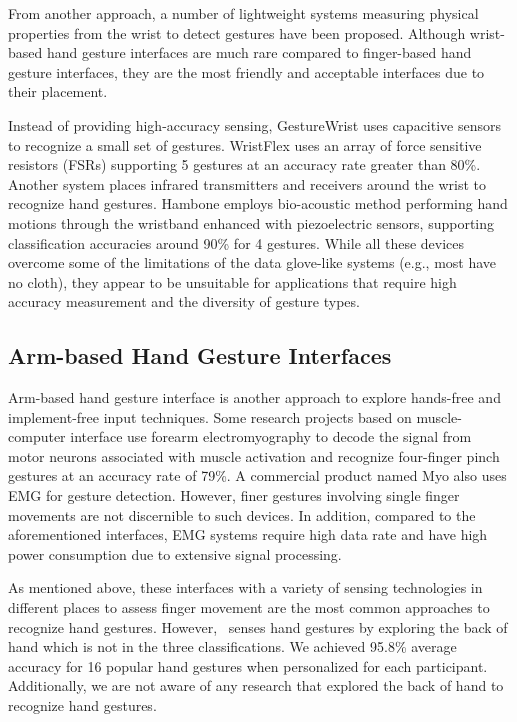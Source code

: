 \documentclass{sigchi}
\begin{document}
From another approach, a number of lightweight systems measuring physical properties from the wrist to detect gestures have been proposed. 
Although wrist-based hand gesture interfaces are much rare compared to finger-based hand gesture interfaces, they are the most friendly and acceptable interfaces due to their placement.

Instead of providing high-accuracy sensing, GestureWrist \cite{Rekimoto:2001:GGU:580581.856565} uses capacitive sensors to recognize a small set of gestures. WristFlex \cite{Dementyev:2014:WLG:2642918.2647396} uses an array of force sensitive resistors (FSRs) supporting 5 gestures at an accuracy rate greater than 80\%. Another system \cite{Fukui:2011:HSC:2030112.2030154} places infrared transmitters and receivers around the wrist to recognize hand gestures. Hambone \cite{4373768} employs bio-acoustic method performing hand motions through the wristband enhanced with piezoelectric sensors, supporting classification accuracies around 90\% for 4 gestures. While all these devices overcome some of the limitations of the data glove-like systems (e.g., most have no cloth), they appear to be unsuitable for applications that require high accuracy measurement and the diversity of gesture types. 

\subsection{Arm-based Hand Gesture Interfaces}

Arm-based hand gesture interface is another approach to explore hands-free and implement-free input techniques. Some research projects based on muscle-computer interface \cite{Saponas:2009:EAI:1622176.1622208} use forearm electromyography to decode the signal from motor neurons associated with muscle activation and recognize four-finger pinch gestures at an accuracy rate of 79\%. A commercial product named Myo \cite{Myo} also uses EMG for gesture detection. However, finer gestures involving single finger movements are not discernible to such devices. In addition, compared to the aforementioned interfaces, EMG systems require high data rate and have high power consumption due to extensive signal processing. 

As mentioned above, these interfaces with a variety of sensing technologies in different places to assess finger movement are the most common approaches to recognize hand gestures. However, \getTitleName\ senses hand gestures by exploring the back of hand which is not in the three classifications. We achieved 95.8\% average accuracy for 16 popular hand gestures when personalized for each participant. Additionally, we are not aware of any research that explored the back of hand to recognize hand gestures.
\end{document}
